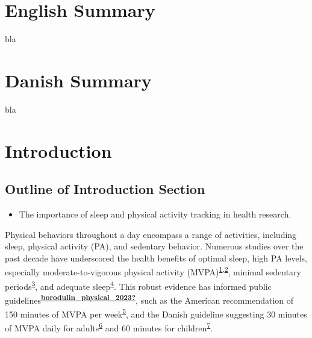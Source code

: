 \documentclass[
  9pt,
]{article}
\providecommand{\tightlist}{%
  \setlength{\itemsep}{0pt}\setlength{\parskip}{0pt}}\usepackage{longtable,booktabs,array}
\newcommand{\aftertocpagenum}{
  \cleardoublepage  %
  \pagenumbering{arabic}
}
\renewcommand*\contentsname{Table of contents}
\newcommand\contentsname{Table of contents}
\begin{document}
\newpage\renewcommand*\contentsname{Table of contents}
{
\hypersetup{linkcolor=}
\setcounter{tocdepth}{3}
\tableofcontents
}
\aftertocpagenum

\newpage

\hypertarget{english-summary}{%
\section{English Summary}\label{english-summary}}

bla

\newpage

\hypertarget{danish-summary}{%
\section{Danish Summary}\label{danish-summary}}

bla

\newpage

\hypertarget{introduction}{%
\section{Introduction}\label{introduction}}

\hypertarget{outline-of-introduction-section}{%
\subsection{Outline of Introduction
Section}\label{outline-of-introduction-section}}

\begin{itemize}
\tightlist
\item
  The importance of sleep and physical activity tracking in health
  research.
\end{itemize}

Physical behaviors throughout a day encompass a range of activities,
including sleep, physical activity (PA), and sedentary behavior.
Numerous studies over the past decade have underscored the health
benefits of optimal sleep, high PA levels, especially
moderate-to-vigorous physical activity
(MVPA)\textsuperscript{\protect\hyperlink{ref-kraus_physical_2019}{1},\protect\hyperlink{ref-lee_effect_2012}{2}},
minimal sedentary
periods\textsuperscript{\protect\hyperlink{ref-wilmot_sedentary_2012}{3}},
and adequate
sleep\textsuperscript{\protect\hyperlink{ref-cappuccio_sleep_2010}{4}}.
This robust evidence has informed public
guidelines\textsuperscript{\protect\hyperlink{ref-borodulin_physical_2023}{\textbf{borodulin\_physical\_2023?}}},
such as the American recommendation of 150 minutes of MVPA per
week\textsuperscript{\protect\hyperlink{ref-kl_physical_2018}{5}}, and
the Danish guideline suggesting 30 minutes of MVPA daily for
adults\textsuperscript{\protect\hyperlink{ref-el-zine_fysisk_nodate-1}{6}}
and 60 minutes for
children\textsuperscript{\protect\hyperlink{ref-el-zine_fysisk_nodate}{7}}.
\end{document}
